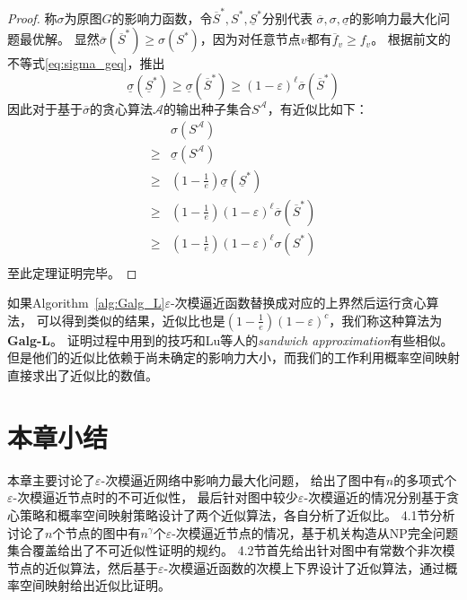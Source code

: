 \begin{proof}
称$\sigma$为原图$G$的影响力函数，令$\overline{S}^*,S^*,\underline{S}^*$分别代表
$\overline{\sigma}, \sigma, \underline{\sigma}$的影响力最大化问题最优解。
显然$\overline{\sigma}(\overline{S}^*) \geq \sigma(S^*)$，因为对任意节点$v$都有$\overline{f}_v \geq f_v$。
根据前文的不等式\ref{eq:sigma_geq}，推出
$$\underline{\sigma}(\underline{S}^*)
\geq \underline{\sigma}(\overline{S}^*)
\geq (1-\varepsilon)^{\ell} \overline{\sigma}(\overline{S}^*)$$
因此对于基于$\overline{\sigma}$的贪心算法$\mathcal{A}$的输出种子集合$S^{\mathcal{A}}$，有近似比如下：
\begin{equation*}
\begin{array}{ll}
& \sigma(S^{\mathcal{A}}) \\
\geq & \underline{\sigma}(S^{\mathcal{A}}) \\
\geq & (1-\frac{1}{e})\underline{\sigma}(\underline{S}^*)\\
\geq & (1-\frac{1}{e})(1-\varepsilon)^{\ell} \overline{\sigma}(\overline{S}^*) \\
\geq &(1-\frac{1}{e})(1-\varepsilon)^{\ell} \sigma(S^*) \\
\end{array}
\end{equation*}
至此定理证明完毕。
\end{proof}

如果Algorithm~\ref{alg:Galg_L}$\varepsilon$-次模逼近函数替换成对应的上界然后运行贪心算法，
可以得到类似的结果，近似比也是$(1-\frac{1}{e})(1-\varepsilon)^c$，我们称这种算法为\textbf{Galg-L}。
证明过程中用到的技巧和Lu等人\cite{lu2015competition}的{\em sandwich approximation}有些相似。
但是他们的近似比依赖于尚未确定的影响力大小，而我们的工作利用概率空间映射直接求出了近似比的数值。


\section{本章小结}
本章主要讨论了$\varepsilon$-次模逼近网络中影响力最大化问题，
给出了图中有$n$的多项式个$\varepsilon$-次模逼近节点时的不可近似性，
最后针对图中较少$\varepsilon$-次模逼近的情况分别基于贪心策略和概率空间映射策略设计了两个近似算法，各自分析了近似比。
4.1节分析讨论了$n$个节点的图中有$n^{\gamma}$个$\varepsilon$-次模逼近节点的情况，基于机关构造从NP完全问题集合覆盖给出了不可近似性证明的规约。
4.2节首先给出针对图中有常数个非次模节点的近似算法，然后基于$\varepsilon$-次模逼近函数的次模上下界设计了近似算法，通过概率空间映射给出近似比证明。







